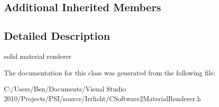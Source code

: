 \subsection*{Additional Inherited Members}


\subsection{Detailed Description}
solid material renderer 

The documentation for this class was generated from the following file\-:\begin{DoxyCompactItemize}
\item 
C\-:/\-Users/\-Ben/\-Documents/\-Visual Studio 2010/\-Projects/\-P\-S\-I/source/\-Irrlicht/C\-Software2\-Material\-Renderer.\-h\end{DoxyCompactItemize}

